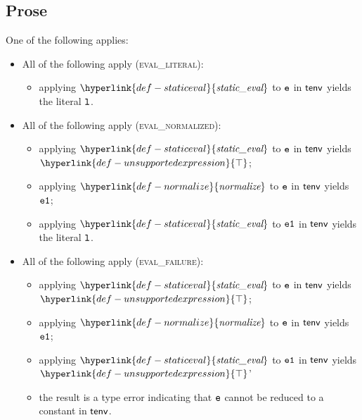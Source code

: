 \documentclass{book}
\newcommand\ProseOrTypeError[0]{\ProseTerminateAs{\TypeErrorConfig}}
\newcommand\staticeval[0]{\hyperlink{def-staticeval}{\textfunc{static\_eval}}}
\newcommand\normalize[0]{\hyperlink{def-normalize}{\textfunc{normalize}}}
\newcommand\CannotBeTransformed[0]{\hyperlink{def-unsupportedexpression}{\top}}
\begin{document}
\subsection{Prose}
One of the following applies:
\begin{itemize}
  \item All of the following apply (\textsc{eval\_literal}):
  \begin{itemize}
    \item applying $\staticeval$ to $\texttt{e}$ in $\textsf{tenv}$ yields the literal $\texttt{l}$\ProseOrTypeError.
  \end{itemize}

  \item All of the following apply (\textsc{eval\_normalized}):
  \begin{itemize}
    \item applying $\staticeval$ to $\texttt{e}$ in $\textsf{tenv}$ yields $\CannotBeTransformed$;
    \item applying $\normalize$ to $\texttt{e}$ in $\textsf{tenv}$ yields $\texttt{e1}$\ProseOrTypeError;
    \item applying $\staticeval$ to $\texttt{e1}$ in $\textsf{tenv}$ yields the literal $\texttt{l}$\ProseOrTypeError.
  \end{itemize}

  \item All of the following apply (\textsc{eval\_failure}):
  \begin{itemize}
    \item applying $\staticeval$ to $\texttt{e}$ in $\textsf{tenv}$ yields $\CannotBeTransformed$;
    \item applying $\normalize$ to $\texttt{e}$ in $\textsf{tenv}$ yields $\texttt{e1}$\ProseOrTypeError;
    \item applying $\staticeval$ to $\texttt{e1}$ in $\textsf{tenv}$ yields $\CannotBeTransformed$'
    \item the result is a type error indicating that $\texttt{e}$ cannot be reduced to a constant in $\textsf{tenv}$.
  \end{itemize}
\end{itemize}

\end{document}
